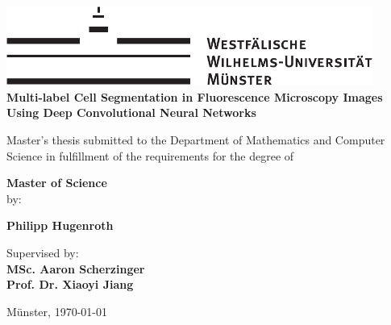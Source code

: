 \begin{centering}
\vspace*{\fill}
\includegraphics[width=12cm]{./img/wwu-logo-neu.pdf}\\[1.5cm]


{\textbf{ \Large
Multi-label Cell Segmentation in Fluorescence Microscopy Images Using Deep Convolutional Neural Networks\\[1.2cm]
}}

{
Master's thesis submitted to the Department of Mathematics and Computer Science in fulfillment of the requirements for the degree of \\[2cm]
}

{\Large \textbf{Master of Science}}\\[4.5cm]

{
by:
}

{\textbf{ \large
Philipp Hugenroth\\[1cm]
}}


    

\hrulefill
                               
{
Supervised by:\\
\textbf{MSc. Aaron Scherzinger}\\
\textbf{Prof. Dr. Xiaoyi Jiang}\\[1cm]
}


{
Münster, \today
}
\vfill
\end{centering}